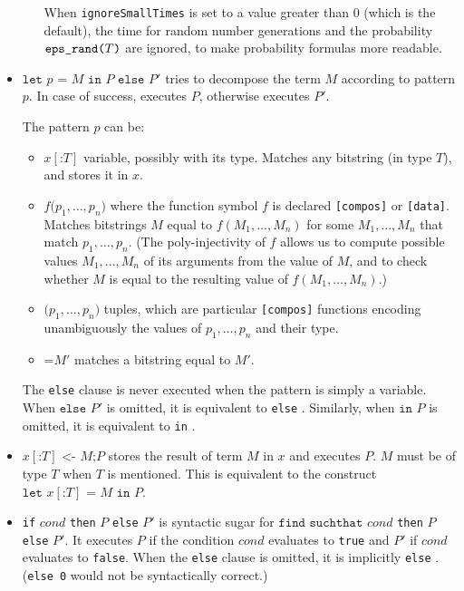 \begin{itemize}
\begin{itemize}
When \texttt{ignoreSmallTimes} is set to a value greater than 0
(which is the default),
the time for random number generations and the probability
$\texttt{eps\_rand(}T\texttt{)}$ are ignored, to make probability formulas 
more readable.

\end{itemize}

\item $\texttt{let }p \texttt{ = }M\texttt{ in }P\texttt{ else }P'$
tries to decompose the term $M$ according to pattern $p$.
In case of success, executes $P$, otherwise executes $P'$.

The pattern $p$ can be:
\begin{itemize}

\item $x[\texttt{:}T]$ variable, possibly with its type. Matches any bitstring
(in type $T$), and stores it in $x$.

\item $f\texttt{(}p_1, \ldots, p_n\texttt{)}$ 
where the function symbol $f$ is declared 
\texttt{[compos]} or \texttt{[data]}. Matches bitstrings $M$ equal to $f(M_1, \ldots, M_n)$
for some $M_1, \ldots, M_n$ that match $p_1, \ldots, p_n$.
(The poly-injectivity of $f$ allows us to compute possible
values $M_1, \ldots, M_n$ of its arguments from the value of $M$, and to check
whether $M$ is equal to the resulting value of $f(M_1, \ldots, M_n)$.) 

\item $\texttt{(}p_1, \ldots, p_n\texttt{)}$ tuples, which are particular \texttt{[compos]}
functions encoding unambiguously the values of $p_1, \ldots, p_n$
and their type.

\item $\texttt{=}M'$ matches a bitstring equal to $M'$.

\end{itemize}
The \texttt{else} clause is never executed when the pattern
is simply a variable.
When $\texttt{else }P'$ is omitted, it is equivalent to \texttt{else} \yield.
Similarly, when $\texttt{in }P$ is omitted, it is equivalent to 
\texttt{in} \yield.

\item $x[\texttt{:}T] \texttt{ <- }M\texttt{;}P$
stores the result of term $M$ in $x$ and executes $P$.
$M$ must be of type $T$ when $T$ is mentioned.
This is equivalent to the construct $\texttt{let } x[\texttt{:}T] 
\texttt{ = }M\texttt{ in }P$.

\item \texttt{if} $\mathit{cond}$ \texttt{then} $P$ \texttt{else} $P'$ is 
syntactic sugar for $\texttt{find suchthat }\mathit{cond}$ \texttt{then} $P$ \texttt{else} $P'$.
It executes $P$ if the condition $\mathit{cond}$ evaluates to \texttt{true} and $P'$ if $\mathit{cond}$ evaluates to \texttt{false}.
When the \texttt{else} clause is omitted, it is implicitly \texttt{else} \yield.
(\texttt{else 0} would not be syntactically correct.) 


\end{itemize}
